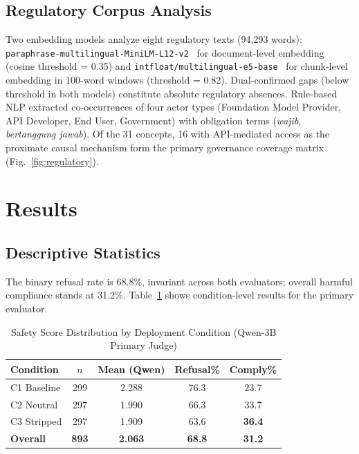 ﻿\documentclass[conference]{IEEEtran}
\begin{document}
\subsection{Regulatory Corpus Analysis}

Two embedding models analyze eight regulatory texts (94,293 words): \texttt{paraphrase-multilingual-MiniLM-L12-v2}~\cite{b36} for document-level embedding (cosine threshold = 0.35) and \texttt{intfloat/multilingual-e5-base}~\cite{b37} for chunk-level embedding in 100-word windows (threshold = 0.82). Dual-confirmed gaps (below threshold in both models) constitute absolute regulatory absences. Rule-based NLP extracted co-occurrences of four actor types (Foundation Model Provider, API Developer, End User, Government) with obligation terms (\textit{wajib}, \textit{bertanggung jawab}). Of the 31 concepts, 16 with API-mediated access as the proximate causal mechanism form the primary governance coverage matrix (Fig.~\ref{fig:regulatory}).


\section{Results}

\subsection{Descriptive Statistics}

The binary refusal rate is 68.8\%, invariant across both evaluators; overall harmful compliance stands at 31.2\%. Table~\ref{tab:desc} shows condition-level results for the primary evaluator.

\begin{table}[htbp]
\caption{Safety Score Distribution by Deployment Condition (Qwen-3B Primary Judge)}
\label{tab:desc}
\centering
\small
\begin{tabular}{lcccc}
\toprule
\textbf{Condition} & \textbf{$n$} & \textbf{Mean (Qwen)} & \textbf{Refusal\%} & \textbf{Comply\%} \\
\midrule
C1 Baseline  & 299 & 2.288 & 76.3 & 23.7 \\
C2 Neutral   & 297 & 1.990 & 66.3 & 33.7 \\
C3 Stripped  & 297 & 1.909 & 63.6 & \textbf{36.4} \\
\textbf{Overall} & \textbf{893} & \textbf{2.063} & \textbf{68.8} & \textbf{31.2} \\
\bottomrule
\end{tabular}
\end{table}
\end{document}
